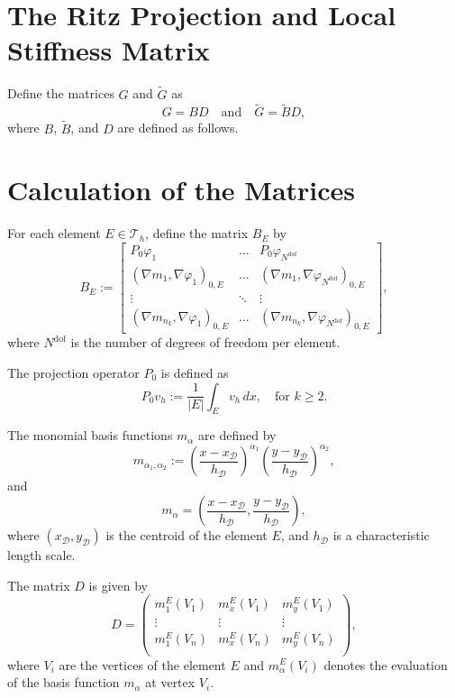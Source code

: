 \documentclass[class=article, crop=false]{standalone}
\begin{document}
\section{The Ritz Projection and Local Stiffness Matrix}
Define the matrices $G$ and $\tilde{G}$ as
\[
G = BD \quad \text{and} \quad \tilde{G} = \tilde{B} D,
\]
where $B$, $\tilde{B}$, and $D$ are defined as follows.

\section{Calculation of the Matrices}
For each element $E \in \mathcal{T}_h$, define the matrix $B_E$ by
\[
B_E := \begin{bmatrix}
    P_0 \varphi_1 & \hdots & P_0 \varphi_{N^\text{dof}} \\
    (\nabla m_1, \nabla \varphi_1)_{0,E} & \hdots & (\nabla m_1, \nabla \varphi_{N^\text{dof}})_{0,E} \\
    \vdots & \ddots & \vdots \\
    (\nabla m_{n_k}, \nabla \varphi_1)_{0,E} & \hdots & (\nabla m_{n_k}, \nabla \varphi_{N^\text{dof}})_{0,E}
\end{bmatrix},
\]
where $N^\text{dof}$ is the number of degrees of freedom per element.

The projection operator $P_0$ is defined as
\begin{equation}
    P_0 v_h := \frac{1}{|E|} \int_E v_h \, dx, \quad \text{for } k \geq 2.
\end{equation}

The monomial basis functions $m_{\alpha}$ are defined by
\begin{equation}
    m_{\alpha_1,\alpha_2} := \left( \frac{x - x_{\mathcal{D}}}{h_{\mathcal{D}}} \right)^{\alpha_1}
    \left( \frac{y - y_{\mathcal{D}}}{h_{\mathcal{D}}} \right)^{\alpha_2},
\end{equation}
and
\begin{equation}
    m_{\alpha} = \left( \frac{x - x_{\mathcal{D}}}{h_{\mathcal{D}}}, \frac{y - y_{\mathcal{D}}}{h_{\mathcal{D}}} \right),
\end{equation}
where $(x_{\mathcal{D}}, y_{\mathcal{D}})$ is the centroid of the element $E$, and $h_{\mathcal{D}}$ is a characteristic length scale.

The matrix $D$ is given by
\begin{equation}
    D = \begin{pmatrix}
        m_1^E(V_1) & m_x^E(V_1) & m_y^E(V_1) \\
        \vdots & \vdots & \vdots \\
        m_1^E(V_n) & m_x^E(V_n) & m_y^E(V_n) \\
    \end{pmatrix},
\end{equation}
where $V_i$ are the vertices of the element $E$ and $m_{\alpha}^E(V_i)$ denotes the evaluation of the basis function $m_{\alpha}$ at vertex $V_i$.
\end{document}
